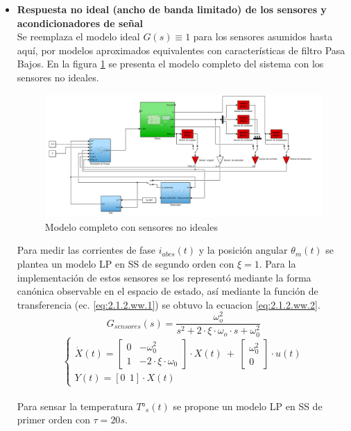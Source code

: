 \documentclass[10pt]{article}
\begin{document}
\begin{itemize}
\item \textbf{Respuesta no ideal (ancho de banda limitado) de los sensores y acondicionadores de señal}\\
Se reemplaza el modelo ideal $G(s)\equiv 1$ para los sensores asumidos hasta aquí, por modelos aproximados equivalentes con características de filtro Pasa Bajos. En la figura \ref{fig:modelocompleto} se presenta el modelo completo del sistema con los sensores no ideales.\\

 \begin{figure}[h!]
	\centering
	\includegraphics[width=\textwidth]{modelocompleto.png}
	\caption{\label{fig:modelocompleto} Modelo completo con sensores no ideales}
	\end{figure}
	
Para medir las corrientes de fase $i_{abcs}(t)$ y la posición angular $\theta_{m}(t)$ se plantea un modelo LP en SS de segundo orden con $\xi=1$. 
Para la implementación de estos sensores se los representó mediante la forma canónica observable en el espacio de estado, así mediante la función de transferencia (ec. \ref{eq:2.1.2.ww.1}) se obtuvo la ecuacion \ref{eq:2.1.2.ww.2}.
		\begin{equation}
		G_{sensores}(s)=\frac{\omega_{o}^{2}}{s^{2}+ 2\cdot\xi\cdot\omega_{o}\cdot s + \omega_{0}^{2}}
			\label{eq:2.1.2.ww.1}
	\end{equation}
			\begin{equation}
\begin{cases}
\dot{X}(t)=\begin{bmatrix}
0 & -\omega_{0}^{2}\\ 
1 & -2\cdot\xi\cdot\omega_{0}
\end{bmatrix}
\cdot X(t)  \ + \
\begin{bmatrix}
\omega_{0}^{2}\\ 
0
\end{bmatrix} \cdot
u(t)
\\ 
Y(t)=[0 \ \ 1]\cdot X(t)
\end{cases}
			\label{eq:2.1.2.ww.2}
	\end{equation}\\
Para sensar la temperatura $T°_{s}(t)$ se propone un modelo LP en SS de primer orden con $\tau=20s$.


\end{itemize}
\end{document}
